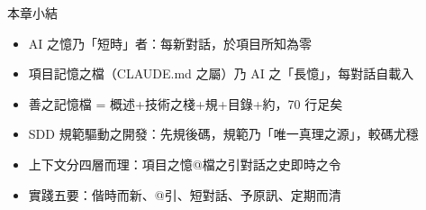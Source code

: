 \begin{tcbsummary}{本章小結}
\begin{itemize}
  \item AI 之憶乃「短時」者：每新對話，於項目所知為零
  \item 項目記憶之檔（CLAUDE.md 之屬）乃 AI 之「長憶」，每對話自載入
  \item 善之記憶檔 = 概述+技術之棧+規+目錄+約，70 行足矣
  \item SDD 規範驅動之開發：先規後碼，規範乃「唯一真理之源」，較碼尤穩
  \item 上下文分四層而理：項目之憶@檔之引對話之史即時之令
  \item 實踐五要：偕時而新、@引、短對話、予原訊、定期而清
\end{itemize}

\end{tcbsummary}
